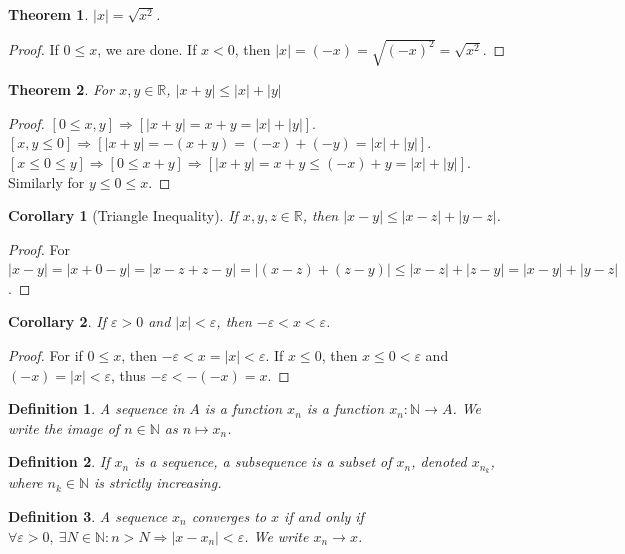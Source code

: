 \documentclass[oneside]{book}
\theoremstyle{mystyle}
\newtheorem{theorem}{Theorem}[section]
\newtheorem{definition}{Definition}[section]
\newtheorem{corollary}{Corollary}[section]
\begin{document}
\begin{theorem}
$|x| = \sqrt{x^2}$.
\end{theorem}
\begin{proof}
If $0 \leq x$, we are done. If $x<0$, then $|x| = (-x) = \sqrt{(-x)^2} = \sqrt{x^2}$.
\end{proof}

\begin{theorem}
For $x,y \in \mathbb{R}$, $|x+y|\leq |x|+|y|$
\end{theorem}
\begin{proof}
$[0\leq x,y]\Rightarrow [|x+y| = x+y = |x|+|y|]$. $[x,y\leq 0]\Rightarrow [|x+y| = -(x+y) = (-x)+(-y)=|x|+|y|]$. $[x\leq 0 \leq y]\Rightarrow [0\leq x+y]\Rightarrow [|x+y| = x+y \leq (-x)+y=|x|+|y|]$. Similarly for $y\leq 0 \leq x$.
\end{proof}

\begin{corollary}[Triangle Inequality]
If $x,y,z\in \mathbb{R}$, then $|x-y| \leq |x-z|+|y-z|$.
\end{corollary}
\begin{proof}
For $|x-y| = |x+ 0 - y| = |x-z+z-y| = |(x-z)+(z-y)| \leq |x-z|+|z-y| = |x-y|+|y-z|$.
\end{proof}

\begin{corollary}
If $\varepsilon >0$ and $|x|<\varepsilon$, then $-\varepsilon < x < \varepsilon$.
\end{corollary}
\begin{proof}
For if $0\leq x$, then $-\varepsilon< x=|x|< \varepsilon$. If $x\leq 0$, then $x\leq 0<\varepsilon$ and $(-x)=|x|<\varepsilon$, thus $-\varepsilon < -(-x) = x$.
\end{proof}

\begin{definition}
A sequence in $A$ is a function $x_n$ is a function $x_n:\mathbb{N}\rightarrow A$. We write the image of $n\in \mathbb{N}$ as $n\mapsto x_n$.
\end{definition}

\begin{definition}
If $x_n$ is a sequence, a subsequence is a subset of $x_n$, denoted $x_{n_k}$, where $n_k\in \mathbb{N}$ is strictly increasing.
\end{definition}

\begin{definition}
A sequence $x_n$ converges to $x$ if and only if $\forall \varepsilon>0,\ \exists N\in \mathbb{N}: n>N\Rightarrow |x-x_n|<\varepsilon$. We write $x_n \rightarrow x$.
\end{definition}
\end{document}
